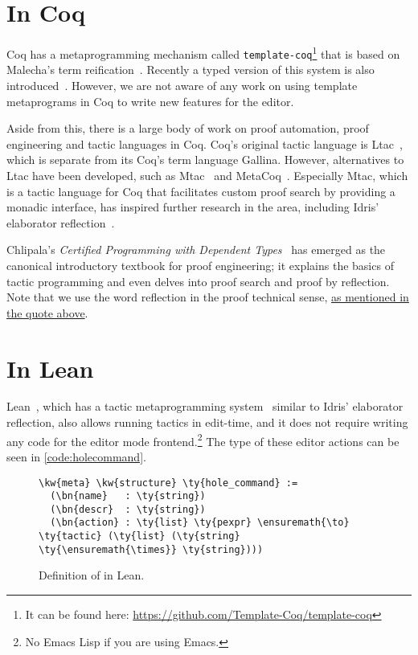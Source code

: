 \section{In Coq}

Coq has a metaprogramming mechanism called
\texttt{template-coq}\footnote{It can be found here:
\url{https://github.com/Template-Coq/template-coq}} that is based on
Malecha's term reification~\cite{malecha-phd}. Recently a typed
version of this system is also introduced~\cite{typed-template-coq}.
However, we are not aware of any work on using template metaprograms in Coq to
write new features for the editor.

Aside from this, there is a large body of work on proof automation, proof
engineering and tactic languages in Coq.  Coq's original tactic language is
Ltac~\cite{ltac}, which is separate from its Coq's term language Gallina.
However, alternatives to Ltac have been developed, such as Mtac~\cite{mtac} and
MetaCoq~\cite{metacoq}.  Especially Mtac, which is a tactic language
for Coq that facilitates custom proof search by providing a monadic interface,
has inspired further research in the area, including Idris' elaborator
reflection~\cite{elabref}.

Chlipala's \emph{Certified Programming with Dependent Types}~\cite{cpdt} has
emerged as the canonical introductory textbook for proof engineering; it
explains the basics of tactic programming and even delves into proof search and
proof by reflection. Note that we use the word reflection in the proof
technical sense, \hyperref[quote:reflection]{as mentioned in the quote above}.

\section{In Lean}

Lean~\cite{lean}, which has a tactic metaprogramming system~\cite{leanmeta}
similar to Idris' elaborator reflection, also allows running tactics in
edit-time, and it does not require writing any code for the editor mode
frontend.\footnote{No Emacs Lisp if you are using Emacs.} The type of these
editor actions can be seen in \autoref{code:holecommand}.

\begin{figure}[ht]
\caption{Definition of  in Lean.}
\label{code:holecommand}
\begin{Verbatim}
\kw{meta} \kw{structure} \ty{hole_command} :=
  (\bn{name}   : \ty{string})
  (\bn{descr}  : \ty{string})
  (\bn{action} : \ty{list} \ty{pexpr} \ensuremath{\to} \ty{tactic} (\ty{list} (\ty{string} \ty{\ensuremath{\times}} \ty{string})))
\end{Verbatim}
\end{figure}


